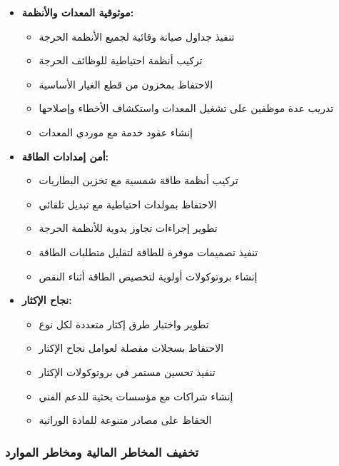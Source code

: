 \begin{itemize}
    \item \textbf{موثوقية المعدات والأنظمة:}
    \begin{itemize}
        \item تنفيذ جداول صيانة وقائية لجميع الأنظمة الحرجة
        \item تركيب أنظمة احتياطية للوظائف الحرجة
        \item الاحتفاظ بمخزون من قطع الغيار الأساسية
        \item تدريب عدة موظفين على تشغيل المعدات واستكشاف الأخطاء وإصلاحها
        \item إنشاء عقود خدمة مع موردي المعدات
    \end{itemize}
    
    \item \textbf{أمن إمدادات الطاقة:}
    \begin{itemize}
        \item تركيب أنظمة طاقة شمسية مع تخزين البطاريات
        \item الاحتفاظ بمولدات احتياطية مع تبديل تلقائي
        \item تطوير إجراءات تجاوز يدوية للأنظمة الحرجة
        \item تنفيذ تصميمات موفرة للطاقة لتقليل متطلبات الطاقة
        \item إنشاء بروتوكولات أولوية لتخصيص الطاقة أثناء النقص
    \end{itemize}
    
    \item \textbf{نجاح الإكثار:}
    \begin{itemize}
        \item تطوير واختبار طرق إكثار متعددة لكل نوع
        \item الاحتفاظ بسجلات مفصلة لعوامل نجاح الإكثار
        \item تنفيذ تحسين مستمر في بروتوكولات الإكثار
        \item إنشاء شراكات مع مؤسسات بحثية للدعم الفني
        \item الحفاظ على مصادر متنوعة للمادة الوراثية
    \end{itemize}
\end{itemize}

\subsubsection{تخفيف المخاطر المالية ومخاطر الموارد}

